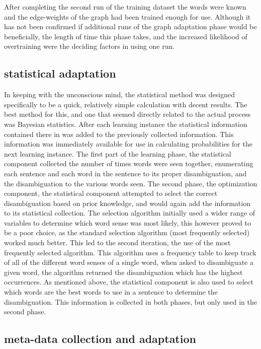 After completing the second run of the training dataset the words were known and the edge-weights of the graph had been trained enough for use.  Although it has not been confirmed if additional runs of the graph adaptation phase would be beneficially, the length of time this phase takes, and the increased likelihood of overtraining were the deciding factors in using one run.

\subsection{statistical adaptation}

In keeping with the unconscious mind, the statistical method was designed specifically to be a quick, relatively simple calculation with decent results.  The best method for this, and one that seemed directly related to the actual process was Bayesian statistics.  After each learning instance the statistical information contained there in was added to the previously collected information.  This information was immediately available for use in calculating probabilities for the next learning instance.  The first part of the learning phase, the statistical component collected the number of times words were seen together, enumerating each sentence and each word in the sentence to its proper disambiguation, and the disambiguation to the various words seen.  The second phase, the optimization component, the statistical component attempted to select the correct disambiguation based on prior knowledge, and would again add the information to its statistical collection.  The selection algorithm initially used a wider range of variables to determine which word sense was most likely, this however proved to be a poor choice, as the standard selection algorithm (most frequently selected) worked much better.  This led to the second iteration, the use of the most frequently selected algorithm.  This algorithm uses a frequency table to keep track of all of the different word senses of a single word, when asked to disambiguate a given word, the algorithm returned the disambiguation which has the highest occurrences.  As mentioned above, the statistical component is also used to select which words are the best words to use in a sentence to determine the disambiguation. This information is collected in both phases, but only used in the second phase.

\subsection{meta-data collection and adaptation}

